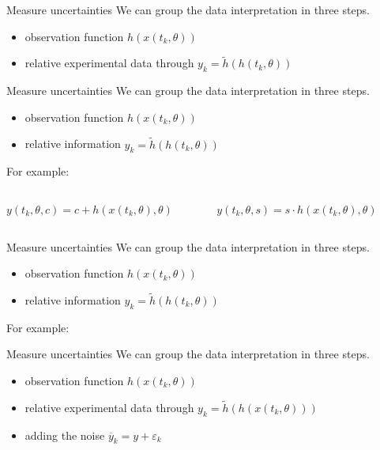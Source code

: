 \documentclass{beamer}
\begin{document}
  	\begin{frame}{Measure uncertainties}
    	We can group the data interpretation in three steps.
    	\begin{itemize}
    		\item observation function $h(x(t_k,\theta))$
    		\item relative experimental data through $y_k = \tilde{h}
    		(h(t_k, \theta))$
    	\end{itemize}
  	\end{frame}
  	
  	\begin{frame}{Measure uncertainties}
    	We can group the data interpretation in three steps.
    	\begin{itemize}
    		\item observation function $h(x(t_k,\theta))$
    		\item relative information $y_k = \tilde{h}
    		(h(t_k, \theta))$
    	\end{itemize}
    	For example:
    	\vspace{0.7cm}
    	\begin{columns}
  			\begin{column}{5cm}
  				$y(t_k,\theta,c) = c + h(x(t_k,\theta),\theta)$
  			\end{column}
  			\begin{column}{5cm}
 				$y(t_k,\theta,s) = s \cdot h(x(t_k,\theta),\theta)$
  			\end{column}
  		\end{columns}
  	\end{frame}
  	
  	\begin{frame}{Measure uncertainties}
    	We can group the data interpretation in three steps.
    	\begin{itemize}
    		\item observation function $h(x(t_k,\theta))$
    		\item relative information $y_k = \tilde{h}
    		(h(t_k, \theta))$
    	\end{itemize}
    	For example:
    	\vspace{0.7cm}
  	\end{frame}  	
  	
  	\begin{frame}{Measure uncertainties}
    	We can group the data interpretation in three steps.
    	\begin{itemize}
    		\item observation function $h(x(t_k,\theta))$
    		\item relative experimental data through $y_k = \tilde{h}
    		(h(x(t_k,\theta)))$
    		\item adding the noise $\overline{y}_{k} = y + \varepsilon_{k}$
    	\end{itemize}
  	\end{frame}
  	
\end{document}
